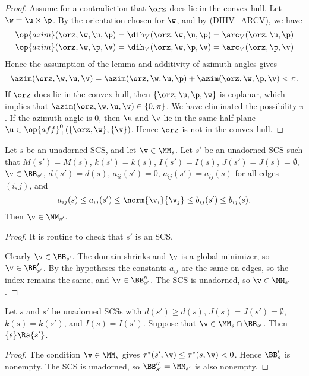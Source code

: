 \begin{proof}
Assume for a contradiction that $\orz$ does lie in the convex hull.
Let $\w = \u\times \p$.  By the orientation chosen for $\w$, and by (DIHV\_ARCV), we have
\begin{align*}
\op{azim}(\orz,\w,\u,\p) &= \dih_V (\orz,\w,\u,\p) = \arc_V (\orz,\u,\p)\\
\op{azim}(\orz,\w,\p,\v) &= \dih_V (\orz,\w,\p,\v) = \arc_V (\orz,\p,\v)\\
\end{align*}
Hence the assumption of the lemma and additivity of azimuth angles gives
\[
\azim(\orz,\w,\u,\v) = \azim(\orz,\w,\u,\p)+\azim(\orz,\w,\p,\v) < \pi.
\]
If $\orz$ does lie in the convex hull, then $\{\orz,\u,\p,\w\}$ is coplanar, which implies that
$\azim(\orz,\w,\u,\v)\in\{0,\pi\}$.
We have eliminated the possibility $\pi$.  If the azimuth angle is $0$, then $\u$ and $\v$ lie
in the same half plane $\u\in \op{aff}_+^0(\{\orz,\w\},\{\v\})$.  Hence $\orz$ is not in the convex hull.
\end{proof}

\begin{lemma}[]\label{lemma:transfer-prelim} 
Let $s$ be an unadorned SCS, and let $\v\in \MM_s$.  Let $s'$ be an unadorned SCS such that
$M(s')=M(s)$, $k(s')=k(s)$, $I(s')=I(s)$, $J(s')=J(s)=\emptyset$, $\v\in \BB_{s'}$, $d(s')=d(s)$, $a_{ii}(s')=0$,
$a_{ij}(s') = a_{ij}(s)$ for all edges $(i,j)$, and
\[
a_{ij} (s) \le a_{ij}(s') \le \norm{\v_i}{\v_j} \le b_{ij}(s') \le b_{ij}(s).
\]
Then  $\v\in \MM_{s'}$.
\end{lemma}

\begin{proof} It is routine to check that $s'$ is an SCS. 

Clearly $\v\in \BB_{s'}$.  
The domain shrinks and $\v$ is a global minimizer, so $\v\in \BB'_{s'}$.
By the hypotheses the constants $a_{ij}$ are the same on edges, so the index remains the same, and $\v\in \BB''_{s'}$.
The SCS is unadorned, so $\v\in \MM_{s'}$.
\end{proof}

\begin{lemma}[]
Let $s$ and $s'$ be unadorned SCSs with $d(s') \ge d(s)$, $J(s)=J(s')=\emptyset$, $k(s) = k(s')$, and $I(s) = I(s')$.
Suppose that $\v\in \MM_s \cap \BB_{s'}$.
Then $\{s\}\Ra \{s'\}$.
\end{lemma}

\begin{proof}
The condition $\v\in\MM_s$ gives $\tau^*(s',\v)\le \tau^*(s,\v)<0$.  Hence $\BB'_s$ is nonempty.
The SCS is unadorned, so $\BB''_{s'} = \MM_{s'}$ is also nonempty.
\end{proof}

